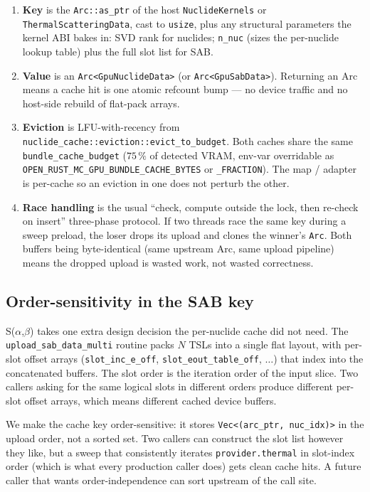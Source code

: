 \begin{enumerate}
    \item \textbf{Key} is the \texttt{Arc::as\_ptr} of the host
        \texttt{NuclideKernels} or \texttt{ThermalScatteringData},
        cast to \texttt{usize}, plus any structural parameters
        the kernel ABI bakes in: SVD rank for nuclides;
        \texttt{n\_nuc} (sizes the per-nuclide lookup table) plus
        the full slot list for SAB.
    \item \textbf{Value} is an \texttt{Arc<GpuNuclideData>} (or
        \texttt{Arc<GpuSabData>}). Returning an Arc means a cache
        hit is one atomic refcount bump --- no device traffic and
        no host-side rebuild of flat-pack arrays.
    \item \textbf{Eviction} is LFU-with-recency from
        \texttt{nuclide\_cache::eviction::evict\_to\_budget}.
        Both caches share the same \texttt{bundle\_cache\_budget}
        ($75\,\%$ of detected VRAM, env-var overridable as
        \texttt{OPEN\_RUST\_MC\_GPU\_BUNDLE\_CACHE\_BYTES} or
        \texttt{\_FRACTION}). The map / adapter is per-cache so an
        eviction in one does not perturb the other.
    \item \textbf{Race handling} is the usual ``check, compute
        outside the lock, then re-check on insert'' three-phase
        protocol. If two threads race the same key during a sweep
        preload, the loser drops its upload and clones the winner's
        \texttt{Arc}. Both buffers being byte-identical (same
        upstream Arc, same upload pipeline) means the dropped
        upload is wasted work, not wasted correctness.
\end{enumerate}

\subsection{Order-sensitivity in the SAB key}

S($\alpha$,$\beta$) takes one extra design decision the per-nuclide
cache did not need. The \texttt{upload\_sab\_data\_multi} routine
packs $N$ TSLs into a single flat layout, with per-slot offset
arrays (\texttt{slot\_inc\_e\_off},
\texttt{slot\_eout\_table\_off}, $\ldots$) that index into the
concatenated buffers. The slot order is the iteration order of the
input slice. Two callers asking for the same logical slots in
different orders produce different per-slot offset arrays, which
means different cached device buffers.

We make the cache key order-sensitive: it stores
\texttt{Vec<(arc\_ptr, nuc\_idx)>} in the upload order, not a
sorted set. Two callers can construct the slot list however they
like, but a sweep that consistently iterates
\texttt{provider.thermal} in slot-index order (which is what every
production caller does) gets clean cache hits. A future caller
that wants order-independence can sort upstream of the call site.

